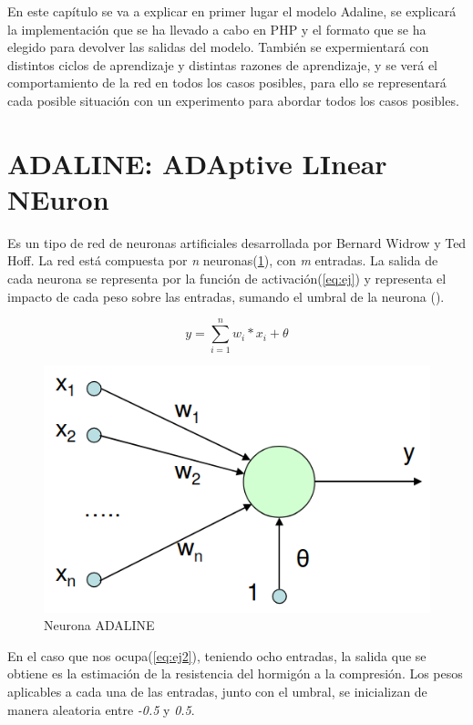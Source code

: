 \documentclass[11pt,spanish,listoffigures,listoftables]{tfgetsinf}
\begin{document}
\par En este capítulo se va a explicar en primer lugar el modelo Adaline, se explicará la implementación que se ha llevado a cabo en PHP y el formato que se ha elegido para devolver las salidas del modelo. También se expermientará con distintos ciclos de aprendizaje y distintas razones de aprendizaje, y se verá el comportamiento de la red en todos los casos posibles, para ello se representará cada posible situación con un experimento para abordar todos los casos posibles.

\section{ADALINE: ADAptive LInear NEuron}

\par Es un tipo de red de neuronas artificiales desarrollada por Bernard Widrow y Ted Hoff. La red está compuesta por \textit{n} neuronas(\ref{fig:adaline}), con \textit{m} entradas. La salida de cada neurona se representa por la función de activación(\ref{eq:ej}) y representa el impacto de cada peso sobre las entradas, sumando el umbral de la neurona (\theta).

\begin{equation}\label{eq:ej}
y = \sum_{i=1}^{n}w_{i}*x_{i} + \theta
\end{equation}

\begin{figure}
\centering
\includegraphics[scale=0.5]{adaline}
\caption{Neurona ADALINE \cite{Adaline}}\label{fig:adaline}
\end{figure}

\par En el caso que nos ocupa(\ref{eq:ej2}), teniendo ocho entradas, la salida que se obtiene es la estimación de la resistencia del hormigón a la compresión. Los pesos aplicables a cada una de las entradas, junto con el umbral, se inicializan de manera aleatoria entre \textit{-0.5} y \textit{0.5}.
\end{document}
